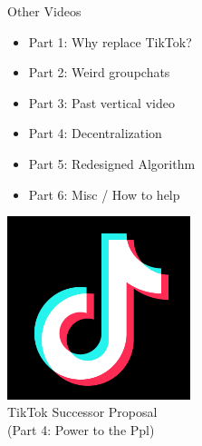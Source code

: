\documentclass[aspectratio=35]{beamer} %
\begin{document}
\begin{frame}{Other Videos}
\centering
\tiny
\vspace{-1.5in}
\begin{itemize}
    \item Part 1: Why replace TikTok?
    \item Part 2: Weird groupchats 
    \item Part 3: Past vertical video
    \item Part 4: Decentralization
    \item Part 5: Redesigned Algorithm
    \item Part 6: Misc / How to help
\end{itemize}
\end{frame}

\begin{frame}
\centering
\vspace{-1in}
\includegraphics[width=0.4\textwidth]{imgs/app_icons/tiktok-icon2.png}\\
TikTok Successor Proposal \\
(Part 4: Power to the Ppl)
\end{frame}
\end{document}
